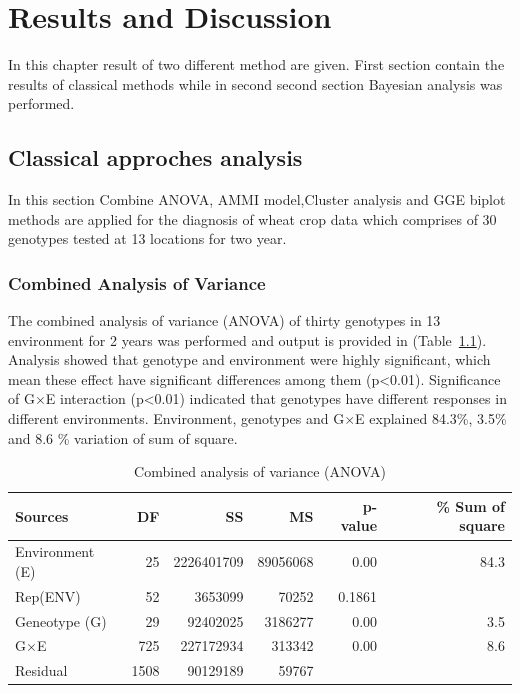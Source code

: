 \chapter{Results and Discussion}\label{result_chapter}
In this chapter result of two different method are given. First section contain the results of classical methods while in second second section Bayesian analysis was performed.
\section{Classical approches analysis}
In this section Combine ANOVA, AMMI model,Cluster analysis  and GGE biplot methods are applied for the diagnosis of wheat crop data which comprises of 30 genotypes tested at 13 locations for two year. 
\subsection{Combined Analysis of Variance}
The combined analysis of variance (ANOVA) of thirty genotypes in 13 environment for 2 years was performed and output is provided in (Table~\ref{Table:4.1}). Analysis showed that genotype and environment were highly significant, which mean these effect have significant differences among them (p<0.01). Significance of G$\times$E interaction (p<0.01) indicated that genotypes have different responses in different environments. Environment, genotypes  and G$\times$E explained 84.3\%, 3.5\% and 8.6 \% variation of sum of square. 

\begin{table}[h!]
\centering	
\caption[Combined Aanlysis of Variance]{Combined analysis of variance (ANOVA)  }
\label{Table:4.1}
\begin{tabular}{l r r r r r}
	\toprule\hline
	
	Sources & DF & SS & MS & p-value & \% Sum of square   \\\hline
	\midrule
	Environment (E) & 25  & 2226401709 & 89056068 & 0.00 & 84.3   \\
	Rep(ENV)        & 52  & 3653099    &  70252   & 0.1861 & \\
	Geneotype (G)   & 29  & 92402025   & 3186277  & 0.00  & 3.5 \\
	G$\times$E      & 725 &  227172934 &  313342  & 0.00 & 8.6  \\ 

	Residual        & 1508& 90129189   &  59767   &        & \\ 
	\bottomrule\hline
	
\end{tabular}

\end{table}

